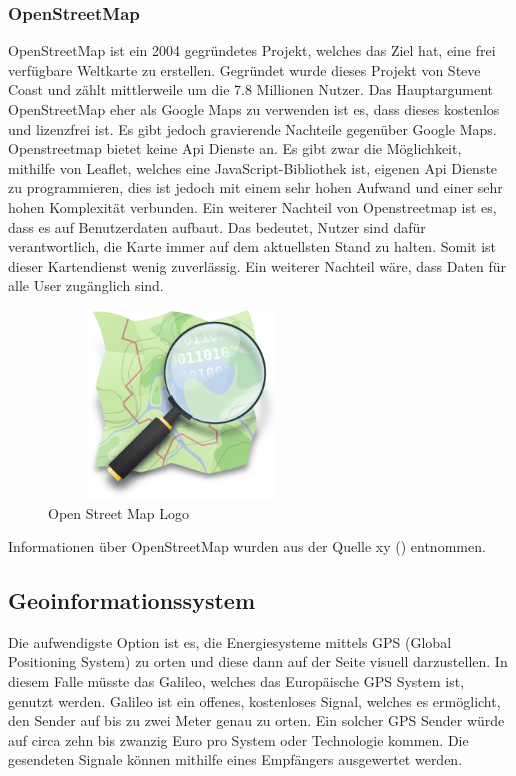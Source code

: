\subsubsection{OpenStreetMap}\label{sec:OpenStreetMap}


OpenStreetMap ist ein 2004 gegründetes Projekt, welches das Ziel hat, eine frei verfügbare Weltkarte zu erstellen. Gegründet wurde dieses Projekt von Steve Coast und zählt mittlerweile um die 7.8 Millionen Nutzer. Das Hauptargument OpenStreetMap eher als Google Maps zu verwenden ist es, dass dieses kostenlos und lizenzfrei ist. Es gibt jedoch gravierende Nachteile gegenüber Google Maps. Openstreetmap bietet keine  Api Dienste an. Es gibt zwar die Möglichkeit, mithilfe von Leaflet, welches eine JavaScript-Bibliothek ist, eigenen Api Dienste zu programmieren, dies ist jedoch mit einem sehr hohen Aufwand und einer sehr hohen Komplexität verbunden. Ein weiterer Nachteil von Openstreetmap ist es, dass es auf Benutzerdaten aufbaut. Das bedeutet, Nutzer sind  dafür verantwortlich, die Karte immer auf dem aktuellsten Stand zu halten. Somit ist dieser Kartendienst wenig zuverlässig.
Ein weiterer Nachteil wäre, dass Daten für alle User zugänglich sind. 
\begin{figure}[h]
	\centering
	\includegraphics[height=5cm,width=7cm]{images/OpenStreetMap_Logo}
	\caption{Open Street Map Logo}
	\label{fig:Open Street Map Logo}
\end{figure}

Informationen über OpenStreetMap wurden aus der Quelle xy () entnommen.
\newpage

\subsection{Geoinformationssystem }
Die aufwendigste Option ist es, die Energiesysteme mittels GPS (Global Positioning System) zu orten und diese dann auf der Seite visuell darzustellen. In diesem Falle müsste das Galileo, welches das Europäische GPS System ist, genutzt werden. Galileo ist ein offenes, kostenloses Signal, welches es ermöglicht, den Sender auf bis zu zwei Meter genau zu orten. Ein solcher GPS Sender würde auf circa zehn bis zwanzig Euro pro System oder Technologie kommen. Die gesendeten Signale können mithilfe eines Empfängers ausgewertet werden.

